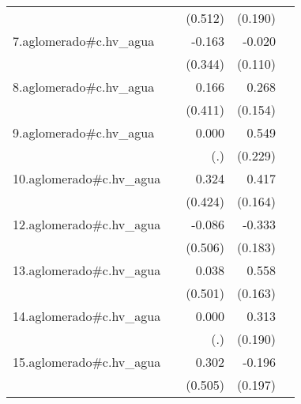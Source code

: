 {\begin{longtable}{l*{4}{D{.}{.}{-1}}}
            &                     &     (0.512)         &     (0.190)         &                     \\
\addlinespace
7.aglomerado#c.hv\_agua&                     &      -0.163         &      -0.020         &                     \\
            &                     &     (0.344)         &     (0.110)         &                     \\
\addlinespace
8.aglomerado#c.hv\_agua&                     &       0.166         &       0.268         &                     \\
            &                     &     (0.411)         &     (0.154)         &                     \\
\addlinespace
9.aglomerado#c.hv\_agua&                     &       0.000         &       0.549\sym{*}  &                     \\
            &                     &         (.)         &     (0.229)         &                     \\
\addlinespace
10.aglomerado#c.hv\_agua&                     &       0.324         &       0.417\sym{*}  &                     \\
            &                     &     (0.424)         &     (0.164)         &                     \\
\addlinespace
12.aglomerado#c.hv\_agua&                     &      -0.086         &      -0.333         &                     \\
            &                     &     (0.506)         &     (0.183)         &                     \\
\addlinespace
13.aglomerado#c.hv\_agua&                     &       0.038         &       0.558\sym{***}&                     \\
            &                     &     (0.501)         &     (0.163)         &                     \\
\addlinespace
14.aglomerado#c.hv\_agua&                     &       0.000         &       0.313         &                     \\
            &                     &         (.)         &     (0.190)         &                     \\
\addlinespace
15.aglomerado#c.hv\_agua&                     &       0.302         &      -0.196         &                     \\
            &                     &     (0.505)         &     (0.197)         &                     \\

\end{longtable}}
